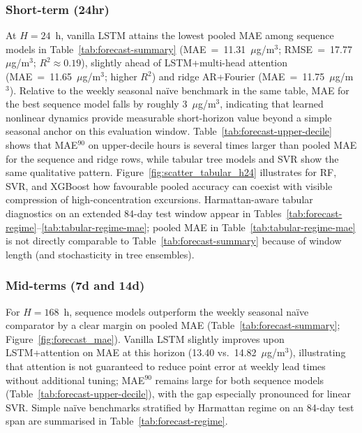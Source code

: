 \documentclass[a4paper,fleqn]{cas-sc}
\begin{document}
\subsubsection{Short-term (24hr)}\label{sec:res24}
At $H=24$~h, vanilla LSTM attains the lowest pooled MAE among sequence models in Table~\ref{tab:forecast-summary} (MAE~=~11.31~$\mu$g/m$^3$; RMSE~=~17.77~$\mu$g/m$^3$; $R^2\approx 0.19$), slightly ahead of LSTM+multi-head attention (MAE~=~11.65~$\mu$g/m$^3$; higher $R^2$) and ridge AR+Fourier (MAE~=~11.75~$\mu$g/m$^3$). Relative to the weekly seasonal naïve benchmark in the same table, MAE for the best sequence model falls by roughly 3~$\mu$g/m$^3$, indicating that learned nonlinear dynamics provide measurable short-horizon value beyond a simple seasonal anchor on this evaluation window. Table~\ref{tab:forecast-upper-decile} shows that MAE$^{90}$ on upper-decile hours is several times larger than pooled MAE for the sequence and ridge rows, while tabular tree models and SVR show the same qualitative pattern. Figure~\ref{fig:scatter_tabular_h24} illustrates for RF, SVR, and XGBoost how favourable pooled accuracy can coexist with visible compression of high-concentration excursions. Harmattan-aware tabular diagnostics on an extended 84-day test window appear in Tables~\ref{tab:forecast-regime}--\ref{tab:tabular-regime-mae}; pooled MAE in Table~\ref{tab:tabular-regime-mae} is not directly comparable to Table~\ref{tab:forecast-summary} because of window length (and stochasticity in tree ensembles).

\subsubsection{Mid-terms (7d and 14d)}\label{sec:res714}
For $H=168$~h, sequence models outperform the weekly seasonal naïve comparator by a clear margin on pooled MAE (Table~\ref{tab:forecast-summary}; Figure~\ref{fig:forecast_mae}). Vanilla LSTM slightly improves upon LSTM+attention on MAE at this horizon (13.40 vs.\ 14.82~$\mu$g/m$^3$), illustrating that attention is not guaranteed to reduce point error at weekly lead times without additional tuning; MAE$^{90}$ remains large for both sequence models (Table~\ref{tab:forecast-upper-decile}), with the gap especially pronounced for linear SVR. Simple naïve benchmarks stratified by Harmattan regime on an 84-day test span are summarised in Table~\ref{tab:forecast-regime}.
\end{document}
